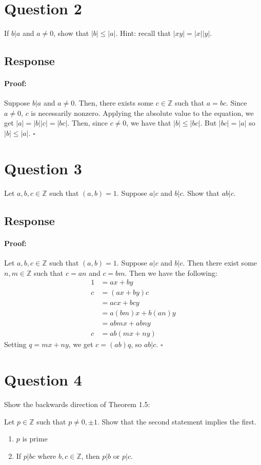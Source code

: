 \documentclass [12pt] {article}
\newcommand{\Z}{\mathbb{Z}}
\newenvironment{proof}{\paragraph{Proof:}}{\hfill$\square$}
\begin{document}
\section*{Question 2}
If $b | a$ and $a \neq 0$, show that $|b| \leq |a|$.  Hint: recall that $|xy| = |x||y|$.

\subsection*{Response}
\begin{proof}
    Suppose $b | a$ and $a \neq 0$. Then, there exists some $c \in \Z$ such that $a = bc$. Since
    $a \neq 0$, $c$ is necessarily nonzero. Applying the absolute value to the equation, we get
    $|a| = |b||c| = |bc|$. Then, since $c \neq 0$, we have that $|b| \leq |bc|$. But $|bc| = |a|$ 
    so $|b| \leq |a|$.
\end{proof}
\newpage

\section*{Question 3}
Let $a,b,c\in \Z$ such that $(a,b)=1$. Suppose $a|c$ and $b|c$. Show that $ab|c$. 

\subsection*{Response}
\begin{proof}
    Let $a, b, c \in \Z$ such that $(a, b) = 1$. Suppose $a | c$ and $b | c$. Then there exist some
    $n, m \in \Z$ such that $c = an$ and $c = bm$. Then we have the following:
    \begin{align*}
        1 &= ax + by \\
        c &= (ax + by)c \\
          &= acx + bcy \\
          &= a(bm)x + b(an)y \\
          &= abmx + abny \\
        c &= ab(mx + ny)
    \end{align*}
    Setting $q = mx + ny$, we get $c = (ab)q$, so $ab | c$.
\end{proof}
\newpage

\section*{Question 4}
Show the backwards direction of Theorem 1.5:

Let $p\in\Z$ such that $p\neq 0,\pm1$. Show that the second statement implies the first.
	\begin{enumerate}
        \item $p$ is prime 
		\item If $p|bc$ where $b,c\in\Z$, then $p|b$ or $p|c$.
	\end{enumerate}
\end{document}
